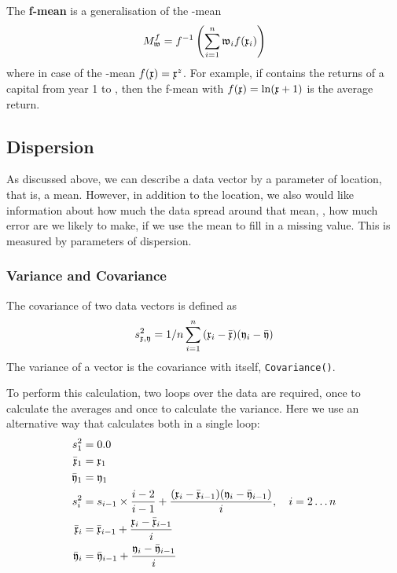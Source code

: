 \begin{refsection}
The \textbf{f-mean} is a generalisation of the -mean
\begin{equation}
  M_{\mathfrak{w}}^f = f^{-1} \left( \sum_{i=1}^n{\mathfrak{w}_i f(\mathfrak{x}_i)} \right)
\end{equation}
where in case of the -mean \( f(\mathfrak{x}) = \mathfrak{x}^z \). For example, if  contains the returns of a capital from year 1 to , then the f-mean with \( f(\mathfrak{x}) = \ln(\mathfrak{x} + 1) \) is the average return.

\subsection{Dispersion}

As discussed above, we can describe a data vector by a parameter of location, that is, a mean. However, in addition to the location, we also would like information about how much the data spread around that mean, , how much error are we likely to make, if we use the mean to fill in a missing value. This is measured by parameters of dispersion.

\subsubsection{Variance and Covariance}

The covariance of two data vectors  is defined as
\begin{equation}
  s_{\mathfrak{x,y}}^2 = 1/n \sum_{i=1}^n{(\mathfrak{x}_i - \bar{\mathfrak{x}}) (\mathfrak{y}_i - \bar{\mathfrak{y}})}
\end{equation}
The variance of a vector is the covariance with itself, \texttt{Covariance()}.

To perform this calculation, two loops over the data are required, once to calculate the averages and once to calculate the variance. Here we use an alternative way that calculates both in a single loop:
\begin{align}
  s^2_1              & = 0.0  \\
  \bar{\mathfrak{x}}_1 & = \mathfrak{x}_1 \notag \\
  \bar{\mathfrak{y}}_1 & = \mathfrak{y}_1 \notag \\
  s^2_i              & = s_{i-1} \times \frac{i-2}{i-1} + \frac{(\mathfrak{x}_i - \bar{\mathfrak{x}}_{i-1})(\mathfrak{y}_i - \bar{\mathfrak{y}}_{i-1})}{i},\quad i = 2\ldots n \notag \\
  \bar{\mathfrak{x}}_i & = \bar{\mathfrak{x}}_{i-1} + \frac{\mathfrak{x}_i - \bar{\mathfrak{x}}_{i-1}}{i} \notag \\
  \bar{\mathfrak{y}}_i & = \bar{\mathfrak{y}}_{i-1} + \frac{\mathfrak{y}_i - \bar{\mathfrak{y}}_{i-1}}{i} \notag
\end{align}


\end{refsection}
